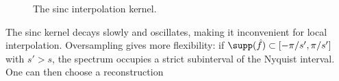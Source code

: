 \begin{figure}[tbp]
\centering
{}
\caption{The sinc interpolation kernel.}
\label{fig-review-shannon-sinc}
\end{figure}
The sinc kernel decays slowly and oscillates, making it inconvenient for local interpolation. Oversampling gives more flexibility: if $\supp(\hat f)\subset[-\pi/s',\pi/s']$ with $s'>s$, the spectrum occupies a strict subinterval of the Nyquist interval. One can then choose a reconstruction 